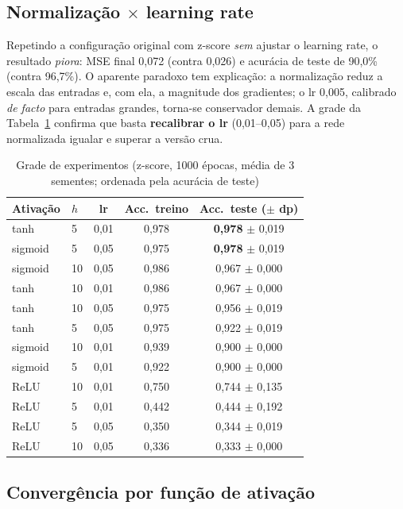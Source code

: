 \documentclass[conference]{IEEEtran}
\begin{document}
\subsection{Normalização $\times$ learning rate}

Repetindo a configuração original com z-score \emph{sem} ajustar o learning rate, o resultado \emph{piora}: MSE final 0,072 (contra 0,026) e acurácia de teste de 90,0\% (contra 96,7\%). O aparente paradoxo tem explicação: a normalização reduz a escala das entradas e, com ela, a magnitude dos gradientes; o lr 0,005, calibrado \emph{de facto} para entradas grandes, torna-se conservador demais. A grade da Tabela~\ref{tab:grid} confirma que basta \textbf{recalibrar o lr} (0,01--0,05) para a rede normalizada igualar e superar a versão crua.

\begin{table}[!t]
\caption{Grade de experimentos (z-score, 1000 épocas, média de 3 sementes; ordenada pela acurácia de teste)}
\label{tab:grid}
\centering
\begin{tabular}{llccc}
\hline
Ativação & $h$ & lr & Acc.\ treino & Acc.\ teste ($\pm$ dp) \\
\hline
tanh     & 5  & 0,01 & 0,978 & \textbf{0,978} $\pm$ 0,019 \\
sigmoid  & 5  & 0,05 & 0,975 & \textbf{0,978} $\pm$ 0,019 \\
sigmoid  & 10 & 0,05 & 0,986 & 0,967 $\pm$ 0,000 \\
tanh     & 10 & 0,01 & 0,986 & 0,967 $\pm$ 0,000 \\
tanh     & 10 & 0,05 & 0,975 & 0,956 $\pm$ 0,019 \\
tanh     & 5  & 0,05 & 0,975 & 0,922 $\pm$ 0,019 \\
sigmoid  & 10 & 0,01 & 0,939 & 0,900 $\pm$ 0,000 \\
sigmoid  & 5  & 0,01 & 0,922 & 0,900 $\pm$ 0,000 \\
ReLU     & 10 & 0,01 & 0,750 & 0,744 $\pm$ 0,135 \\
ReLU     & 5  & 0,01 & 0,442 & 0,444 $\pm$ 0,192 \\
ReLU     & 5  & 0,05 & 0,350 & 0,344 $\pm$ 0,019 \\
ReLU     & 10 & 0,05 & 0,336 & 0,333 $\pm$ 0,000 \\
\hline
\end{tabular}
\end{table}

\subsection{Convergência por função de ativação}
\end{document}
